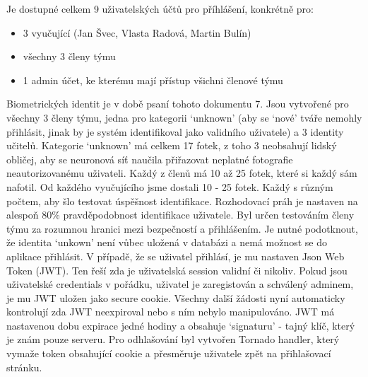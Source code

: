 Je dostupné celkem 9 uživatelských účtů pro příhlášení, konkrétně pro: 
\begin{itemize}
    \item 3 vyučující (Jan Švec, Vlasta Radová, Martin Bulín)%
    \item všechny 3 členy týmu
    \item 1 admin účet, ke kterému mají přístup všichni členové týmu
\end{itemize}
Biometrických identit je v době psaní tohoto dokumentu 7. Jsou vytvořené pro všechny 3 členy týmu, jedna pro kategorii `unknown' (aby se `nové' tváře nemohly přihlásit, jinak by je systém identifikoval jako validního uživatele) a 3 identity učitelů. 
Kategorie `unknown' má celkem 17 fotek, z toho 3 neobsahují lidský obličej, aby se neuronová síť naučila přiřazovat neplatné fotografie neautorizovanému uživateli.
Každý z členů má 10 až 25 fotek, které si každý sám nafotil.
Od každého vyučujícího jsme dostali 10 - 25 fotek. Každý s různým počtem, aby šlo testovat úspěšnost identifikace.
Rozhodovací práh je nastaven na alespoň 80\% pravděpodobnost identifikace uživatele. Byl určen testováním členy týmu za rozumnou hranici mezi bezpečností a přihlášením.
Je nutné podotknout, že identita `unkown' není vůbec uložená v databázi a nemá možnost se do aplikace přihlásit.
V případě, že se uživatel přihlásí, je mu nastaven Json Web Token (JWT). Ten řeší zda je uživatelská session validní či nikoliv.
Pokud jsou uživatelské credentials v pořádku, uživatel je zaregistován a schválený adminem, je mu JWT uložen jako secure cookie.
Všechny další žádosti nyní automaticky kontrolují zda JWT neexpiroval nebo s ním nebylo manipulováno. 
JWT má nastavenou dobu expirace jedné hodiny a obsahuje `signaturu' - tajný klíč, který je znám pouze serveru.  
Pro odhlašování byl vytvořen Tornado handler, který vymaže token obsahující cookie a přesměruje uživatele zpět na přihlašovací stránku.